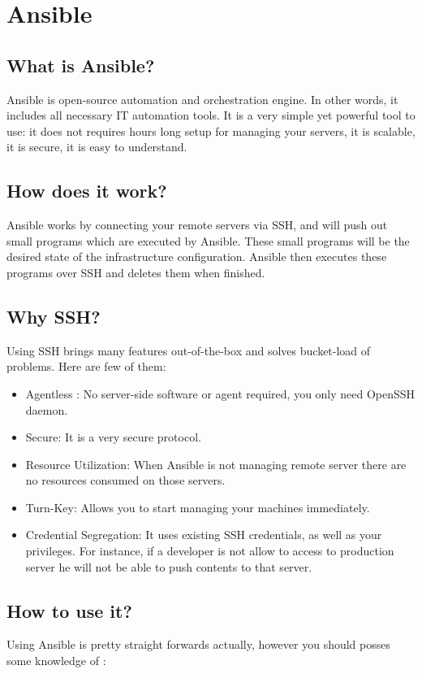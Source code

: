 \documentclass[10pt]{book}
\begin{document}
\section{Ansible}
\subsection{What is Ansible?}
Ansible is open-source automation and orchestration engine. In other words, 
it includes all necessary IT automation tools. It is a very simple yet powerful tool to use: 
it does not requires hours long setup for managing your servers, it is scalable, 
it is secure, it is easy to understand.


\subsection{How does it work?}
Ansible works by connecting your remote servers via SSH, and will push out 
small programs which are executed by Ansible. 
These small programs will be the desired state of the infrastructure configuration.
Ansible then executes these programs over SSH and deletes them when finished.


\subsection{Why SSH?}
Using SSH brings many features out-of-the-box and solves bucket-load of 
problems. Here are few of them:

\begin{itemize}
\item Agentless : No server-side software or agent required, you only need OpenSSH 
daemon.
\item Secure: It is a very secure protocol.
\item Resource Utilization: When Ansible is not managing remote server there 
are no resources consumed on those servers.
\item Turn-Key: Allows you to start managing your machines immediately.

\item Credential Segregation: It uses existing SSH credentials, as well as your 
privileges. For instance, if a developer is not allow to access to production server 
he will not be able to push contents to that server.
 
\end{itemize}
 
 


\subsection{How to use it?}
Using Ansible is pretty straight forwards actually, however you should posses some knowledge 
of :
\end{document}
